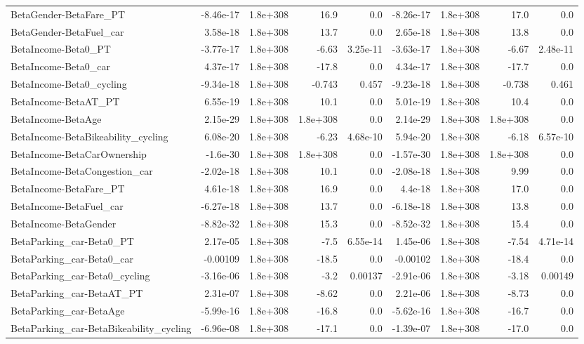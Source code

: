 \begin{tabular}{lrrrrrrrr}
BetaGender-BetaFare_PT & -8.46e-17 & 1.8e+308 & 16.9 & 0.0 & -8.26e-17 & 1.8e+308 & 17.0 & 0.0 \\
BetaGender-BetaFuel_car & 3.58e-18 & 1.8e+308 & 13.7 & 0.0 & 2.65e-18 & 1.8e+308 & 13.8 & 0.0 \\
BetaIncome-Beta0_PT & -3.77e-17 & 1.8e+308 & -6.63 & 3.25e-11 & -3.63e-17 & 1.8e+308 & -6.67 & 2.48e-11 \\
BetaIncome-Beta0_car & 4.37e-17 & 1.8e+308 & -17.8 & 0.0 & 4.34e-17 & 1.8e+308 & -17.7 & 0.0 \\
BetaIncome-Beta0_cycling & -9.34e-18 & 1.8e+308 & -0.743 & 0.457 & -9.23e-18 & 1.8e+308 & -0.738 & 0.461 \\
BetaIncome-BetaAT_PT & 6.55e-19 & 1.8e+308 & 10.1 & 0.0 & 5.01e-19 & 1.8e+308 & 10.4 & 0.0 \\
BetaIncome-BetaAge & 2.15e-29 & 1.8e+308 & 1.8e+308 & 0.0 & 2.14e-29 & 1.8e+308 & 1.8e+308 & 0.0 \\
BetaIncome-BetaBikeability_cycling & 6.08e-20 & 1.8e+308 & -6.23 & 4.68e-10 & 5.94e-20 & 1.8e+308 & -6.18 & 6.57e-10 \\
BetaIncome-BetaCarOwnership & -1.6e-30 & 1.8e+308 & 1.8e+308 & 0.0 & -1.57e-30 & 1.8e+308 & 1.8e+308 & 0.0 \\
BetaIncome-BetaCongestion_car & -2.02e-18 & 1.8e+308 & 10.1 & 0.0 & -2.08e-18 & 1.8e+308 & 9.99 & 0.0 \\
BetaIncome-BetaFare_PT & 4.61e-18 & 1.8e+308 & 16.9 & 0.0 & 4.4e-18 & 1.8e+308 & 17.0 & 0.0 \\
BetaIncome-BetaFuel_car & -6.27e-18 & 1.8e+308 & 13.7 & 0.0 & -6.18e-18 & 1.8e+308 & 13.8 & 0.0 \\
BetaIncome-BetaGender & -8.82e-32 & 1.8e+308 & 15.3 & 0.0 & -8.52e-32 & 1.8e+308 & 15.4 & 0.0 \\
BetaParking_car-Beta0_PT & 2.17e-05 & 1.8e+308 & -7.5 & 6.55e-14 & 1.45e-06 & 1.8e+308 & -7.54 & 4.71e-14 \\
BetaParking_car-Beta0_car & -0.00109 & 1.8e+308 & -18.5 & 0.0 & -0.00102 & 1.8e+308 & -18.4 & 0.0 \\
BetaParking_car-Beta0_cycling & -3.16e-06 & 1.8e+308 & -3.2 & 0.00137 & -2.91e-06 & 1.8e+308 & -3.18 & 0.00149 \\
BetaParking_car-BetaAT_PT & 2.31e-07 & 1.8e+308 & -8.62 & 0.0 & 2.21e-06 & 1.8e+308 & -8.73 & 0.0 \\
BetaParking_car-BetaAge & -5.99e-16 & 1.8e+308 & -16.8 & 0.0 & -5.62e-16 & 1.8e+308 & -16.7 & 0.0 \\
BetaParking_car-BetaBikeability_cycling & -6.96e-08 & 1.8e+308 & -17.1 & 0.0 & -1.39e-07 & 1.8e+308 & -17.0 & 0.0 \\

\end{tabular}
